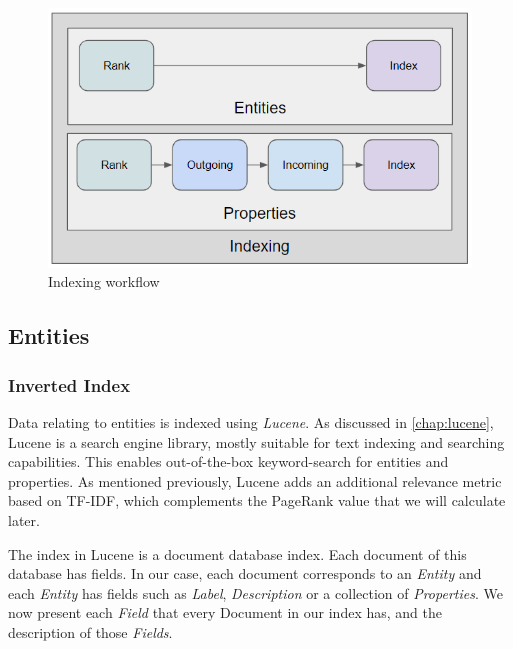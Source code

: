\begin{figure}[H]
    \centering
        \includegraphics[width=0.7\linewidth]{imagenes/Indexing.png}
        \caption{Indexing workflow}
        \label{fig:indexing}
\end{figure}

\subsection{Entities}

\subsubsection{Inverted Index}

Data relating to entities is indexed using \textit{Lucene}. 
As discussed in \autoref{chap:lucene}, Lucene is a search engine library, mostly suitable for text indexing and searching capabilities. 
This enables out-of-the-box keyword-search for entities and properties.
As mentioned previously, Lucene adds an additional relevance metric based on TF-IDF, which complements the PageRank value that we will calculate later.

The index in Lucene is a document database index. 
Each document of this database has fields. 
In our case, each document corresponds to an \textit{Entity} and each \textit{Entity} has fields such as \textit{Label}, \textit{Description} or a collection of \textit{Properties}. 
We now present each \textit{Field} that every Document in our index has, and the description of those \textit{Fields}.

